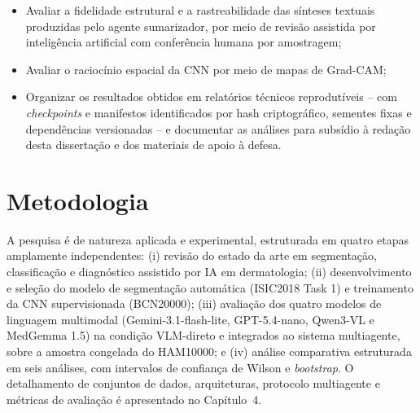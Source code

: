 \begin{itemize}
    \item Avaliar a fidelidade estrutural e a rastreabilidade das sínteses textuais produzidas pelo agente sumarizador, por meio de revisão assistida por inteligência artificial com conferência humana por amostragem;

    \item Avaliar o raciocínio espacial da CNN por meio de mapas de Grad-CAM;

    \item Organizar os resultados obtidos em relatórios técnicos reprodutíveis -- com \textit{checkpoints} e manifestos identificados por hash criptográfico, sementes fixas e dependências versionadas -- e documentar as análises para subsídio à redação desta dissertação e dos materiais de apoio à defesa.
\end{itemize}

\section{Metodologia}

A pesquisa é de natureza aplicada e experimental, estruturada em quatro etapas amplamente independentes: (i) revisão do estado da arte em segmentação, classificação e diagnóstico assistido por IA em dermatologia; (ii) desenvolvimento e seleção do modelo de segmentação automática (ISIC2018 Task 1) e treinamento da CNN supervisionada (BCN20000); (iii) avaliação dos quatro modelos de linguagem multimodal (Gemini-3.1-flash-lite, GPT-5.4-nano, Qwen3-VL e MedGemma 1.5) na condição VLM-direto e integrados ao sistema multiagente, sobre a amostra congelada do HAM10000; e (iv) análise comparativa estruturada em seis análises, com intervalos de confiança de Wilson e \textit{bootstrap}. O detalhamento de conjuntos de dados, arquiteturas, protocolo multiagente e métricas de avaliação é apresentado no Capítulo~4.



